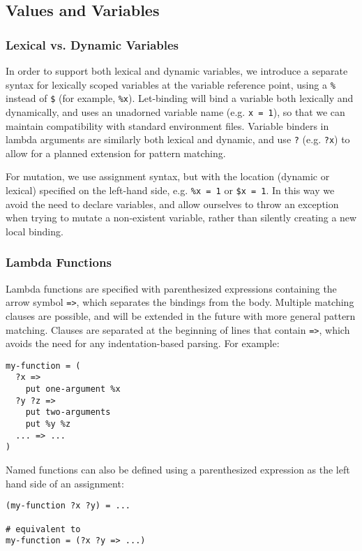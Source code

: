 \documentclass[english,PRO]{ipsj}
\begin{document}
\subsection{Values and Variables}

\subsubsection{Lexical vs. Dynamic Variables}\noindent
In order to support both lexical and dynamic variables, we introduce a separate syntax for lexically scoped variables at the variable reference point, using a \verb/%/ instead of \verb/$/ (for example, \verb/%x/). Let-binding will bind a variable both lexically and dynamically, and uses an unadorned variable name (e.g. \verb/x = 1/), so that we can maintain compatibility with standard environment files. Variable binders in lambda arguments are similarly both lexical and dynamic, and use \verb/?/ (e.g. \verb/?x/) to allow for a planned extension for pattern matching.

For mutation, we use assignment syntax, but with the location (dynamic or lexical) specified on the left-hand side, e.g. \verb/%x = 1/ or \verb/$x = 1/. In this way we avoid the need to declare variables, and allow ourselves to throw an exception when trying to mutate a non-existent variable, rather than silently creating a new local binding.

\subsubsection{Lambda Functions}\noindent
Lambda functions are specified with parenthesized expressions containing the arrow symbol \verb/=>/, which separates the bindings from the body. Multiple matching clauses are possible, and will be extended in the future with more general pattern matching. Clauses are separated at the beginning of lines that contain \verb/=>/, which avoids the need for any indentation-based parsing. For example:
\begin{lstlisting}
my-function = (
  ?x =>
    put one-argument %x
  ?y ?z =>
    put two-arguments
    put %y %z
  ... => ...
)
\end{lstlisting}

\noindent
Named functions can also be defined using a parenthesized expression as the left hand side of an assignment:
\begin{lstlisting}
(my-function ?x ?y) = ...

# equivalent to
my-function = (?x ?y => ...)
\end{lstlisting}
\end{document}
